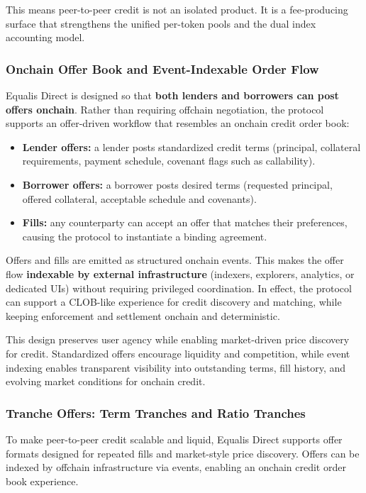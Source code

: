 \documentclass[version=preprint]{iacrcc}
\begin{document}
This means peer-to-peer credit is not an isolated product. It is a fee-producing surface that strengthens the unified per-token pools and the dual index accounting model.

\subsubsection{Onchain Offer Book and Event-Indexable Order Flow}

Equalis Direct is designed so that \textbf{both lenders and borrowers can post offers onchain}. Rather than requiring offchain negotiation, the protocol supports an offer-driven workflow that resembles an onchain credit order book:
\begin{itemize}
  \item \textbf{Lender offers:} a lender posts standardized credit terms (principal, collateral requirements, payment schedule, covenant flags such as callability).
  \item \textbf{Borrower offers:} a borrower posts desired terms (requested principal, offered collateral, acceptable schedule and covenants).
  \item \textbf{Fills:} any counterparty can accept an offer that matches their preferences, causing the protocol to instantiate a binding agreement.
\end{itemize}

Offers and fills are emitted as structured onchain events. This makes the offer flow \textbf{indexable by external infrastructure} (indexers, explorers, analytics, or dedicated UIs) without requiring privileged coordination. In effect, the protocol can support a CLOB-like experience for credit discovery and matching, while keeping enforcement and settlement onchain and deterministic.

This design preserves user agency while enabling market-driven price discovery for credit. Standardized offers encourage liquidity and competition, while event indexing enables transparent visibility into outstanding terms, fill history, and evolving market conditions for onchain credit.

\subsubsection{Tranche Offers: Term Tranches and Ratio Tranches}

To make peer-to-peer credit scalable and liquid, Equalis Direct supports offer formats designed for repeated fills and market-style price discovery. Offers can be indexed by offchain infrastructure via events, enabling an onchain credit order book experience.
\end{document}
